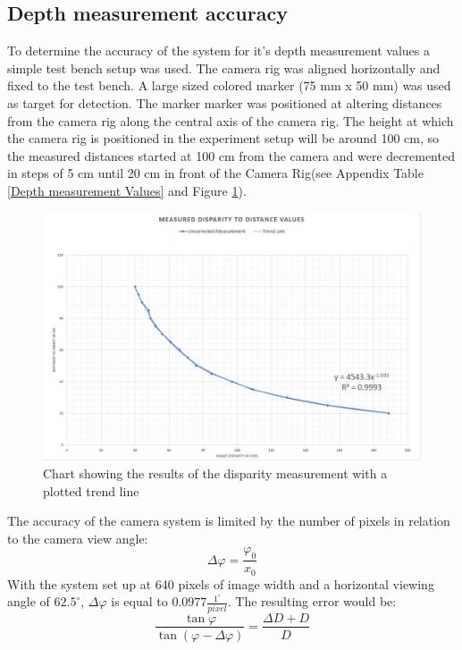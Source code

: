 \subsection{Depth measurement accuracy}
To determine the accuracy of the system for it's depth measurement values a simple test bench setup was used. The camera rig was aligned horizontally and fixed to the test bench. A large sized colored marker (75 mm x 50 mm) was used as target for detection. The marker marker was positioned at altering distances from the camera rig along the central axis of the camera rig. The height at which the camera rig is positioned in the experiment setup will be around 100 cm, so the measured distances started at 100 cm from the camera and were decremented in steps of 5 cm until 20 cm in front of the Camera Rig(see Appendix Table \ref{Depth measurement Values} and Figure \ref{char:DisparityToDistanceChart}).
\begin{figure}[H]
\includegraphics[width=\textwidth]{images/Disparity_to_distance.JPG}
\caption{Chart showing the results of the disparity measurement with a plotted trend line}
\label{char:DisparityToDistanceChart} 
\end{figure}The accuracy of the camera system is limited by the number of pixels in relation to the camera view angle:\\
\begin{equation}
\Delta\varphi=\frac{\varphi_0}{x_0}
\end{equation}
With the system set up at 640 pixels of image width and a horizontal viewing angle of $62.5^\circ$, $\Delta\varphi$ is equal to $0.0977\frac{1^\circ}{pixel}$.
The resulting error would be:
\begin{equation}
\frac{\tan \varphi}{\tan(\varphi -\Delta\varphi)}=\frac{\Delta D+D}{D}
\end{equation}

